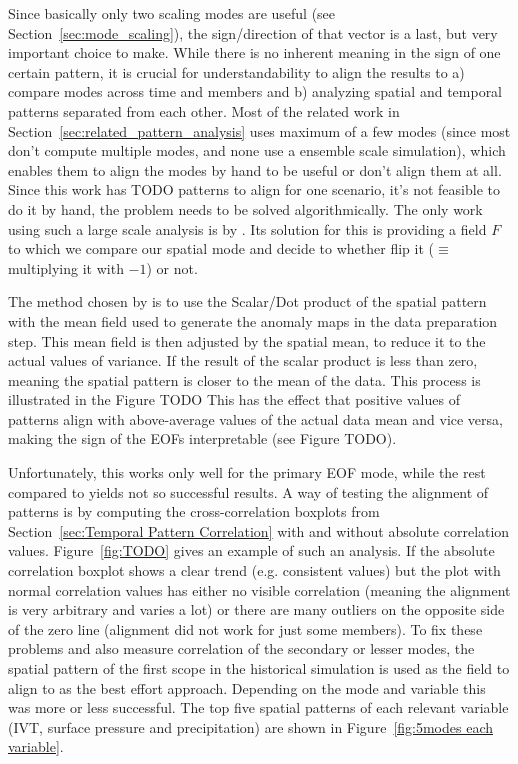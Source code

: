 Since basically only two scaling modes are useful (see Section~\ref{sec:mode_scaling}), the sign/direction of that vector is a last, but very important choice to make.
While there is no inherent meaning in the sign of one certain pattern, it is crucial for understandability to align the results to a) compare modes across time and members and b) analyzing spatial and temporal patterns separated from each other. 
Most of the related work in Section~\ref{sec:related_pattern_analysis} uses maximum of a few modes (since most don't compute multiple modes, and none use a ensemble scale simulation), which enables them to align the modes by hand to be useful or don't align them at all.
Since this work has TODO patterns to align for one scenario, it's not feasible to do it by hand, the problem needs to be solved algorithmically. 
The only work using such a large scale analysis is by \citeauthor{vietinghoffdiss} \cite{vietinghoffdiss}.  
Its solution for this is providing a field $F$ to which we compare our spatial mode and decide to whether flip it ($\equiv$ multiplying it with $-1$) or not. 

The method chosen by \citeauthor{vietinghoffdiss} \cite{vietinghoffdiss} is to use the Scalar/Dot product of the spatial pattern with the mean field used to generate the anomaly maps in the data preparation step. 
This mean field is then adjusted by the spatial mean, to reduce it to the actual values of variance. 
If the result of the scalar product is less than zero, meaning the spatial pattern is closer to the mean of the data. 
This process is illustrated in the Figure TODO  
This has the effect that positive values of patterns align with above-average values of the actual data mean and vice versa, making the sign of the EOFs interpretable \cite{vietinghoffdiss} (see Figure TODO). 

Unfortunately, this works only well for the primary EOF mode, while the rest compared to yields not so successful results. 
A way of testing the alignment of patterns is by computing the cross-correlation boxplots from Section~\ref{sec:Temporal Pattern Correlation} with and without absolute correlation values.
Figure~\ref{fig:TODO} gives an example of such an analysis. 
If the absolute correlation boxplot shows a clear trend (e.g. consistent values) but the plot with normal correlation values has either no visible correlation (meaning the alignment is very arbitrary and varies a lot) or there are many outliers on the opposite side of the zero line (alignment did not work for just some members). 
To fix these problems and also measure correlation of the secondary or lesser modes, the spatial pattern of the first scope in the historical simulation is used as the field to align to as the best effort approach. Depending on the mode and variable this was more or less successful. 
The top five spatial patterns of each relevant variable (IVT, surface pressure and precipitation) are shown in Figure~\ref{fig:5modes each variable}.



